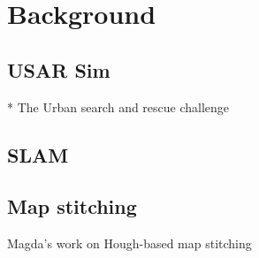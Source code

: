 \chapter{Background}
\section{USAR Sim}
* The Urban search and rescue challenge

\section{SLAM}


\section{Map stitching}
Magda's work on Hough-based map stitching